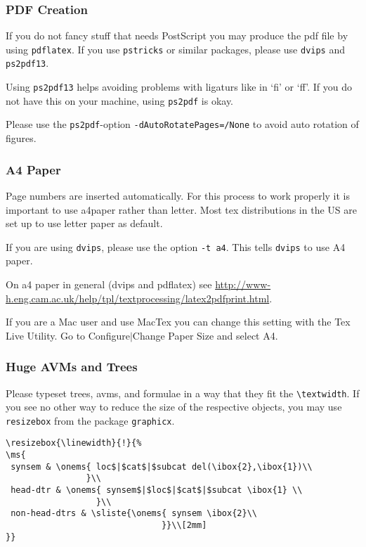 \documentclass[11pt,a4paper,fleqn]{article}
\begin{document}
\subsubsection{PDF Creation}

If you do not fancy stuff that needs PostScript you may produce
the pdf file by using \verb+pdflatex+. If you use \verb+pstricks+ or
similar packages, please use \verb+dvips+ and \verb+ps2pdf13+.

Using \verb+ps2pdf13+ helps avoiding problems with ligaturs like in `fi'
or `ff'. If you do not have this on your machine, using \verb+ps2pdf+ is okay.

Please use the \verb+ps2pdf+-option \verb+-dAutoRotatePages=/None+  to avoid auto rotation
of figures.


\subsubsection{A4 Paper}

Page numbers are inserted automatically. For this process to work properly it is important to use
a4paper rather than letter. Most tex distributions in the US are set up to use letter paper as default.

If you are using \verb+dvips+, please use the option \verb+-t a4+. This tells
\verb+dvips+ to use A4 paper.

On a4 paper in general (dvips and pdflatex) see \url{http://www-h.eng.cam.ac.uk/help/tpl/textprocessing/latex2pdfprint.html}.

If you are a Mac user and use MacTex you can change this setting with the Tex Live Utility. Go to
Configure$|$Change Paper Size and select A4.

\subsubsection{Huge AVMs and Trees}
\label{huge}

Please typeset trees, avms, and formulae in a way that they fit the
\verb+\textwidth+. If you see no other way to reduce the size of the respective
objects, you may use \verb+resizebox+ from the package \verb+graphicx+.
{\small
\begin{verbatim}
\resizebox{\linewidth}{!}{%
\ms{
 synsem & \onems{ loc$|$cat$|$subcat del(\ibox{2},\ibox{1})\\
                }\\
 head-dtr & \onems{ synsem$|$loc$|$cat$|$subcat \ibox{1} \\
                  }\\
 non-head-dtrs & \sliste{\onems{ synsem \ibox{2}\\ 
                               }}\\[2mm]
}}
\end{verbatim}
}
\end{document}
